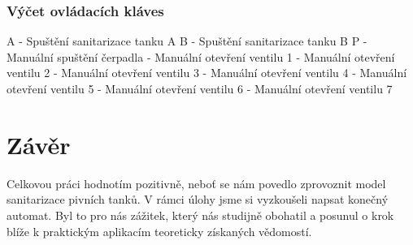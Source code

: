 \documentclass[12pt, a4paper]{article}
\begin{document}
\subsubsection{Výčet ovládacích kláves} \label{ovladani}
A - Spuštění sanitarizace tanku A \newline 
B - Spuštění sanitarizace tanku B \newline 
P - Manuální spuštění čerpadla  - Manuální otevření ventilu 1  - Manuální otevření ventilu 2  - Manuální otevření ventilu 3  - Manuální otevření ventilu 4  - Manuální otevření ventilu 5  - Manuální otevření ventilu 6  - Manuální otevření ventilu 7 \newline 

\section{Závěr}
Celkovou práci hodnotím pozitivně, neboť se nám povedlo zprovoznit model sanitarizace pivních tanků. V rámci úlohy jsme si vyzkoušeli napsat konečný automat. Byl to pro nás zážitek, který nás studijně obohatil a posunul o krok blíže k praktickým aplikacím teoreticky získaných vědomostí. 
\end{document}
